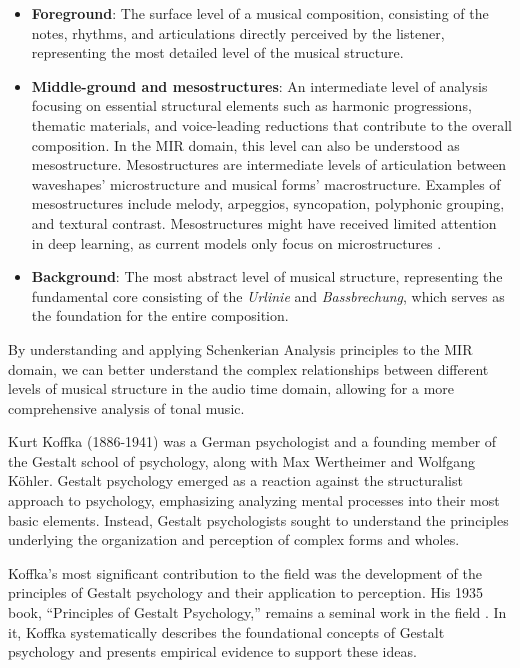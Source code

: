 \begin{itemize}
\item \textbf{Foreground}: The surface level of a musical composition, consisting of the notes, rhythms, and articulations directly perceived by the listener, representing the most detailed level of the musical structure.

\item \textbf{Middle-ground and mesostructures}: An intermediate level of analysis focusing on essential structural elements such as harmonic progressions, thematic materials, and voice-leading reductions that contribute to the overall composition. In the MIR domain, this level can also be understood as mesostructure. Mesostructures are intermediate levels of articulation between waveshapes' microstructure and musical forms' macrostructure. Examples of mesostructures include melody, arpeggios, syncopation, polyphonic grouping, and textural contrast. Mesostructures might have received limited attention in deep learning, as current models only focus on microstructures \cite{Mesostructures2023}.

\item \textbf{Background}: The most abstract level of musical structure, representing the fundamental core consisting of the \textit{Urlinie} and \textit{Bassbrechung}, which serves as the foundation for the entire composition.
\end{itemize}

By understanding and applying Schenkerian Analysis principles to the MIR domain, we can better understand the complex relationships between different levels of musical structure in the audio time domain, allowing for a more comprehensive analysis of tonal music.



Kurt Koffka (1886-1941) was a German psychologist and a founding member of the Gestalt school of psychology, along with Max Wertheimer and Wolfgang Köhler. Gestalt psychology emerged as a reaction against the structuralist approach to psychology, emphasizing analyzing mental processes into their most basic elements. Instead, Gestalt psychologists sought to understand the principles underlying the organization and perception of complex forms and wholes.

Koffka's most significant contribution to the field was the development of the principles of Gestalt psychology and their application to perception. His 1935 book, ``Principles of Gestalt Psychology,'' remains a seminal work in the field \cite{Koffka2013PrinciplesPsychology}. In it, Koffka systematically describes the foundational concepts of Gestalt psychology and presents empirical evidence to support these ideas.

